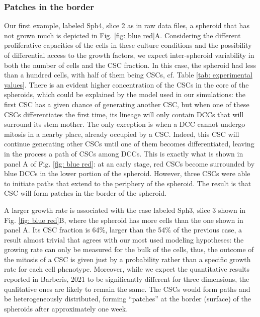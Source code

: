 \documentclass[fleqn,10pt]{wlscirep}
\begin{document}
\subsubsection*{Patches in the border}

Our first example, labeled \textsf{ Sph4, slice 2} as in raw data files, a spheroid that has not grown much is depicted in Fig. \ref{fig: blue red}A. Considering the different proliferative capacities of the cells in these culture conditions and the possibility of differential access to the growth factors, we expect inter-spheroid variability in both the number of cells and the CSC fraction. In this case, the spheroid had less than a hundred cells, with half of them being CSCs, cf. Table \ref{tab: experimental values}. There is an evident higher concentration of the CSCs in the core of the spheroids, which could be explained by the model used in our simulations: the first CSC has a given chance of generating another CSC, but when one of these CSCs differentiates the first time, its lineage will only contain DCCs that will surround its stem mother. The only exception is when a DCC cannot undergo mitosis in a nearby place, already occupied by a CSC. Indeed, this CSC will continue generating other CSCs until one of them becomes differentiated, leaving in the process a path of CSCs among DCCs. This is exactly what is shown in panel A of Fig. \ref{fig: blue red}: at an early stage, red CSCs become surrounded by blue DCCs in the lower portion of the spheroid. However, three CSCs were able to initiate paths that extend to the periphery of the spheroid. The result is that CSC will form patches in the border of the spheroid.


A larger growth rate is associated with the case labeled \textsf{ Sph3, slice 3} shown in Fig. \ref{fig: blue red}B, where the spheroid has more cells than the one shown in panel A. Its CSC fraction is 64\%, larger than the 54\% of the previous case, a result almost trivial that agrees with our most used modeling hypotheses: the growing rate can only be measured for the bulk of the cells\cite{benitez2021}, thus, the outcome of the mitosis of a CSC is given just by a probability rather than a specific growth rate for each cell phenotype. Moreover, while we expect the quantitative results reported in Barberis, 2021\cite{barberis2021percolation} to be significantly different for three dimensions, the qualitative ones are likely to remain the same. The CSCs would form paths and be heterogeneously distributed, forming ``patches'' at the border (surface) of the spheroids after approximately one week.  
\end{document}
